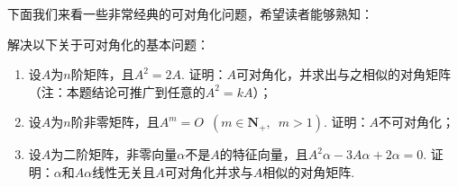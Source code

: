 下面我们来看一些非常经典的可对角化问题，希望读者能够熟知：
\begin{example}\label{ex:19:可对角化经典例题}
    解决以下关于可对角化的基本问题：
    \begin{enumerate}
        \item 设$A$为$n$阶矩阵，且$A^2=2A$. 证明：$A$可对角化，并求出与之相似的对角矩阵（注：本题结论可推广到任意的$A^2=kA$）；

        \item 设$A$为$n$阶非零矩阵，且$A^m=O\enspace(m\in\mathbf{N}_+,\enspace m>1)$. 证明：$A$不可对角化；

        \item 设$A$为二阶矩阵，非零向量$\alpha$不是$A$的特征向量，且$A^2\alpha-3A\alpha+2\alpha=0$. 证明：$\alpha$和$A\alpha$线性无关且$A$可对角化并求与$A$相似的对角矩阵.
    \end{enumerate}
\end{example}

